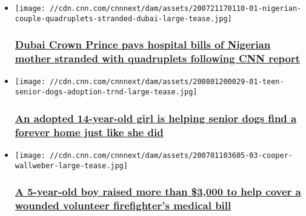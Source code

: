 \begin{itemize}
\item
  \href{/2020/07/30/africa/dubai-ruler-pays-nigerian-mom-hospital-bills/index.html}{}

  \texttt{[image: //cdn.cnn.com/cnnnext/dam/assets/200721170110-01-nigerian-couple-quadruplets-stranded-dubai-large-tease.jpg]}

  \hypertarget{dubai-crown-prince-pays-hospital-bills-of-nigerian-mother-stranded-with-quadruplets-following-cnn-report}{%
  \subsubsection{\texorpdfstring{\href{/2020/07/30/africa/dubai-ruler-pays-nigerian-mom-hospital-bills/index.html}{Dubai
  Crown Prince pays hospital bills of Nigerian mother stranded with
  quadruplets following CNN
  report}}{Dubai Crown Prince pays hospital bills of Nigerian mother stranded with quadruplets following CNN report}}\label{dubai-crown-prince-pays-hospital-bills-of-nigerian-mother-stranded-with-quadruplets-following-cnn-report}}
\item
  \href{/2020/08/02/us/teen-senior-dogs-adoption-trnd/index.html}{}

  \texttt{[image: //cdn.cnn.com/cnnnext/dam/assets/200801200029-01-teen-senior-dogs-adoption-trnd-large-tease.jpg]}

  \hypertarget{an-adopted-14-year-old-girl-is-helping-senior-dogs-find-a-forever-home-just-like-she-did}{%
  \subsubsection{\texorpdfstring{\href{/2020/08/02/us/teen-senior-dogs-adoption-trnd/index.html}{An
  adopted 14-year-old girl is helping senior dogs find a forever home
  just like she
  did}}{An adopted 14-year-old girl is helping senior dogs find a forever home just like she did}}\label{an-adopted-14-year-old-girl-is-helping-senior-dogs-find-a-forever-home-just-like-she-did}}
\item
  \href{/2020/07/02/us/iyw-community-supports-injured-firefighter-trnd/index.html}{}

  \texttt{[image: //cdn.cnn.com/cnnnext/dam/assets/200701103605-03-cooper-wallweber-large-tease.jpg]}

  \hypertarget{a-5-year-old-boy-raised-more-than-3000-to-help-cover-a-wounded-volunteer-firefighters-medical-bill-1}{%
  \subsubsection{\texorpdfstring{\href{/2020/07/02/us/iyw-community-supports-injured-firefighter-trnd/index.html}{A
  5-year-old boy raised more than \$3,000 to help cover a wounded
  volunteer firefighter's medical
  bill}}{A 5-year-old boy raised more than \$3,000 to help cover a wounded volunteer firefighter's medical bill}}\label{a-5-year-old-boy-raised-more-than-3000-to-help-cover-a-wounded-volunteer-firefighters-medical-bill-1}}
\end{itemize}

